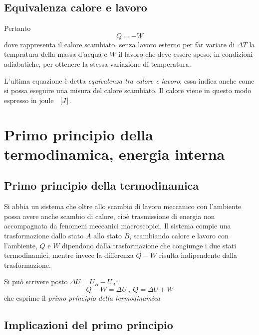 \documentclass[class=book, crop=false, oneside, 12pt]{standalone}
\begin{document}
\subsection{Equivalenza calore e lavoro}

Pertanto 
\begin{equation}
    Q = -W
\end{equation}
dove rappresenta il calore scambiato, senza lavoro esterno per far variare di \(\Delta T\) la tempratura della massa d'acqua e \(W\) il lavoro che deve essere speso, in condizioni adiabatiche, per ottenere la stessa variazione di temperatura. 

L'ultima equazione è detta \emph{equivalenza tra calore e lavoro}; essa indica anche come si possa eseguire una misura del calore scambiato. 
Il calore viene in questo modo espresso in joule \(\hspace{0.2cm} \left[J\right]\).

\section{Primo principio della termodinamica, energia interna}

\subsection{Primo principio della termodinamica}

Si abbia un sistema che oltre allo scambio di lavoro meccanico con l'ambiente possa avere anche scambio di calore, cioè trasmissione di energia non accompagnata da fenomeni meccanici macroscopici.
Il sistema compie una trasformazione dallo stato \(A\) allo stato \(B\), scambiando calore e lavoro con l'ambiente, \(Q\) e \(W\) dipendono dalla trasformazione che congiunge i due stati termodinamici, mentre invece la differenza \(Q-W\) risulta indipendente dalla trasformazione. 

Si può scrivere posto \(\Delta U = U_B - U_A\):
\begin{equation} \label{primo_principio_termodinamica}
    Q - W = \Delta U \ , \ Q = \Delta U + W
\end{equation}
che esprime il \emph{primo principio della termodinamica}

\subsection{Implicazioni del primo principio}
\end{document}
